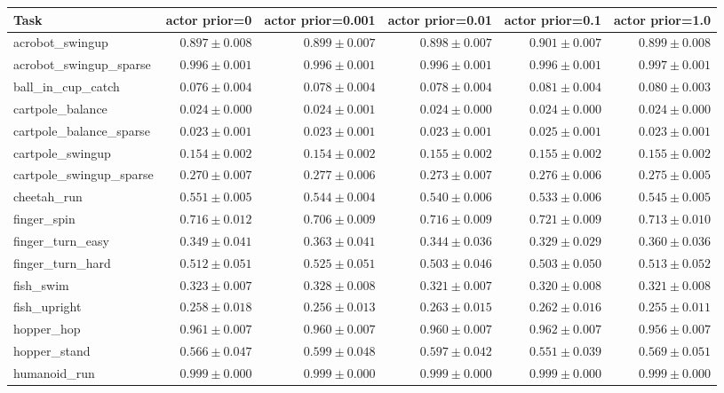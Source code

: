 \begin{tabular}{lrrrrr}
  \toprule
  Task & actor prior=0 & actor prior=0.001 & actor prior=0.01 & actor prior=0.1 & actor prior=1.0 \\
  \midrule
  acrobot\_swingup & $0.897\pm0.008$ & $0.899\pm0.007$ & $0.898\pm0.007$ & $0.901\pm0.007$ & $0.899\pm0.008$ \\
  acrobot\_swingup\_sparse & $0.996\pm0.001$ & $0.996\pm0.001$ & $0.996\pm0.001$ & $0.996\pm0.001$ & $0.997\pm0.001$ \\
  ball\_in\_cup\_catch & $0.076\pm0.004$ & $0.078\pm0.004$ & $0.078\pm0.004$ & $0.081\pm0.004$ & $0.080\pm0.003$ \\
  cartpole\_balance & $0.024\pm0.000$ & $0.024\pm0.001$ & $0.024\pm0.000$ & $0.024\pm0.000$ & $0.024\pm0.000$ \\
  cartpole\_balance\_sparse & $0.023\pm0.001$ & $0.023\pm0.001$ & $0.023\pm0.001$ & $0.025\pm0.001$ & $0.023\pm0.001$ \\
  cartpole\_swingup & $0.154\pm0.002$ & $0.154\pm0.002$ & $0.155\pm0.002$ & $0.155\pm0.002$ & $0.155\pm0.002$ \\
  cartpole\_swingup\_sparse & $0.270\pm0.007$ & $0.277\pm0.006$ & $0.273\pm0.007$ & $0.276\pm0.006$ & $0.275\pm0.005$ \\
  cheetah\_run & $0.551\pm0.005$ & $\mathbf{0.544\pm0.004}$ & $\mathbf{0.540\pm0.006}$ & $\mathbf{0.533\pm0.006}$ & $\mathbf{0.545\pm0.005}$ \\
  finger\_spin & $0.716\pm0.012$ & $\mathbf{0.706\pm0.009}$ & $0.716\pm0.009$ & $0.721\pm0.009$ & $0.713\pm0.010$ \\
  finger\_turn\_easy & $0.349\pm0.041$ & $0.363\pm0.041$ & $0.344\pm0.036$ & $0.329\pm0.029$ & $0.360\pm0.036$ \\
  finger\_turn\_hard & $0.512\pm0.051$ & $0.525\pm0.051$ & $0.503\pm0.046$ & $0.503\pm0.050$ & $0.513\pm0.052$ \\
  fish\_swim & $0.323\pm0.007$ & $0.328\pm0.008$ & $0.321\pm0.007$ & $0.320\pm0.008$ & $0.321\pm0.008$ \\
  fish\_upright & $0.258\pm0.018$ & $0.256\pm0.013$ & $0.263\pm0.015$ & $0.262\pm0.016$ & $0.255\pm0.011$ \\
  hopper\_hop & $0.961\pm0.007$ & $0.960\pm0.007$ & $0.960\pm0.007$ & $0.962\pm0.007$ & $0.956\pm0.007$ \\
  hopper\_stand & $0.566\pm0.047$ & $0.599\pm0.048$ & $0.597\pm0.042$ & $0.551\pm0.039$ & $0.569\pm0.051$ \\
  humanoid\_run & $0.999\pm0.000$ & $0.999\pm0.000$ & $0.999\pm0.000$ & $0.999\pm0.000$ & $0.999\pm0.000$ \\

\end{tabular}
